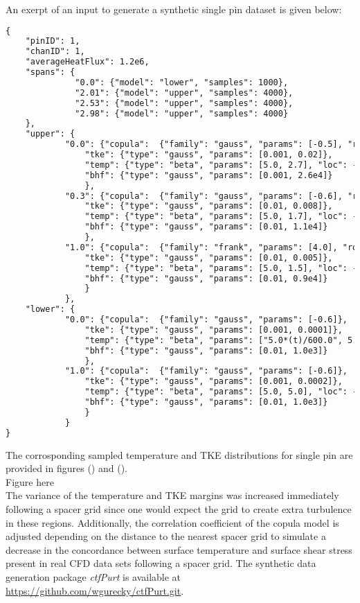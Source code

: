An exerpt of an input to generate a synthetic single pin dataset is given below:
\tiny
\begin{lstlisting}[language=XML]
{
    "pinID": 1,
    "chanID": 1,
    "averageHeatFlux": 1.2e6,
    "spans": {
              "0.0": {"model": "lower", "samples": 1000},
              "2.01": {"model": "upper", "samples": 4000},
              "2.53": {"model": "upper", "samples": 4000},
              "2.98": {"model": "upper", "samples": 4000}
    },
    "upper": {
            "0.0": {"copula":  {"family": "gauss", "params": [-0.5], "rot": 0},
                "tke": {"type": "gauss", "params": [0.001, 0.02]},
                "temp": {"type": "beta", "params": [5.0, 2.7], "loc": -9.2, "scale": 12.0},
                "bhf": {"type": "gauss", "params": [0.001, 2.6e4]}
                },
            "0.3": {"copula":  {"family": "gauss", "params": [-0.6], "rot": 0},
                "tke": {"type": "gauss", "params": [0.01, 0.008]},
                "temp": {"type": "beta", "params": [5.0, 1.7], "loc": -7.0, "scale": 8.0},
                "bhf": {"type": "gauss", "params": [0.01, 1.1e4]}
                },
            "1.0": {"copula":  {"family": "frank", "params": [4.0], "rot": 1},
                "tke": {"type": "gauss", "params": [0.01, 0.005]},
                "temp": {"type": "beta", "params": [5.0, 1.5], "loc": -4.0, "scale": 5.0},
                "bhf": {"type": "gauss", "params": [0.01, 0.9e4]}
                }
            },
    "lower": {
            "0.0": {"copula":  {"family": "gauss", "params": [-0.6]},
                "tke": {"type": "gauss", "params": [0.001, 0.0001]},
                "temp": {"type": "beta", "params": ["5.0*(t)/600.0", 5.0], "loc": -2.0, "scale": 4.0},
                "bhf": {"type": "gauss", "params": [0.01, 1.0e3]}
                },
            "1.0": {"copula":  {"family": "gauss", "params": [-0.6]},
                "tke": {"type": "gauss", "params": [0.001, 0.0002]},
                "temp": {"type": "beta", "params": [5.0, 5.0], "loc": -2.0, "scale": 4.0},
                "bhf": {"type": "gauss", "params": [0.01, 1.0e3]}
                }
            }
}
\end{lstlisting}
\normalsize

The corrosponding sampled temperature and TKE distributions for single pin are provided in figures () and (). \\

Figure here \\

The variance of the temperature and TKE margins was increased immediately following a spacer grid since one would expect the grid to create extra turbulence in these regions.  Additionally, the correlation coefficient of the copula model is adjusted depending on the distance to the nearest spacer grid to simulate a decrease in the concordance between surface temperature and surface shear stress present in real CFD data sets following a spacer grid. 
The synthetic data generation package \emph{ctfPurt} is available at \url{https://github.com/wgurecky/ctfPurt.git}.


